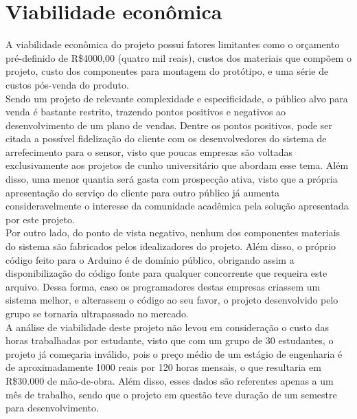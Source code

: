 
\chapter{Viabilidade econômica}
A viabilidade econômica do projeto possui fatores limitantes como o orçamento pré-definido de R\$4000,00 (quatro mil reais), custos dos materiais que compõem o projeto, custo dos componentes para montagem do protótipo, e uma série de custos pós-venda do produto. \\

Sendo um projeto de relevante complexidade e especificidade, o público alvo para venda é bastante restrito, trazendo pontos positivos e negativos ao desenvolvimento de um plano de vendas. Dentre os pontos positivos, pode ser citada a possível fidelização do cliente com os desenvolvedores do sistema de arrefecimento para o sensor, visto que poucas empresas são voltadas exclusivamente aos projetos de cunho universitário que abordam esse tema. Além disso, uma menor quantia será gasta com prospecção ativa, visto que a própria apresentação do serviço do cliente para outro público já aumenta consideravelmente o interesse da comunidade acadêmica pela solução apresentada por este projeto. \\

Por outro lado, do ponto de vista negativo, nenhum dos componentes materiais do sistema são fabricados pelos idealizadores do projeto. Além disso, o próprio código feito para o Arduino é de domínio público, obrigando assim a disponibilização do código fonte para qualquer concorrente que requeira este arquivo. Dessa forma, caso os programadores destas empresas criassem um sistema melhor, e alterassem o código ao seu favor, o projeto desenvolvido pelo grupo se tornaria ultrapassado no mercado.\\ 

A análise de viabilidade deste projeto não levou em consideração o custo das horas trabalhadas por estudante, visto que com um grupo de 30 estudantes, o projeto já começaria inválido, pois o preço médio de um estágio de engenharia é de aproximadamente 1000 reais por 120 horas mensais, o que resultaria em R\$30.000 de mão-de-obra. Além disso, esses dados são referentes apenas a um mês de trabalho, sendo que o projeto em questão teve duração de um semestre para desenvolvimento. \\

